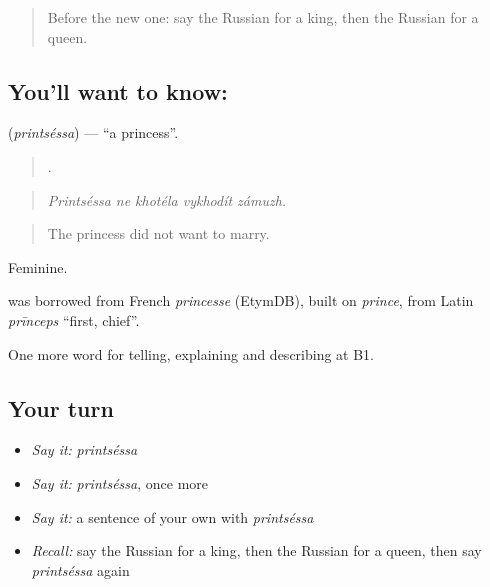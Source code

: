 \label{lesson:RU-C321-printsessa}



\begin{quote}
Before the new one: say the Russian for a king, then the Russian for a queen.
\end{quote}

\subsection*{You'll want to know: }
\textbf{} (\emph{printséssa}) — \textquotedblleft{}a princess\textquotedblright{}.

\begin{quote}
    .
\end{quote}

\begin{quote}
\emph{Printséssa ne khotéla vykhodít zámuzh.}
\end{quote}

\begin{quote}
The princess did not want to marry.
\end{quote}

Feminine.

\begin{cousinweb}
\emph{} was borrowed from French \emph{princesse} (EtymDB), built on \emph{prince}, from Latin \emph{prīnceps} \textquotedblleft{}first, chief\textquotedblright{}.
\end{cousinweb}

\begin{grammarlens}[title={What you've built}]
One more word for telling, explaining and describing at B1.
\end{grammarlens}

\subsection*{Your turn}
\begin{itemize}
\raggedright
  \item \emph{Say it:} \emph{printséssa}
  \item \emph{Say it:} \emph{printséssa}, once more
  \item \emph{Say it:} a sentence of your own with \emph{printséssa}
  \item \emph{Recall:} say the Russian for a king, then the Russian for a queen, then say \emph{printséssa} again
\end{itemize}

